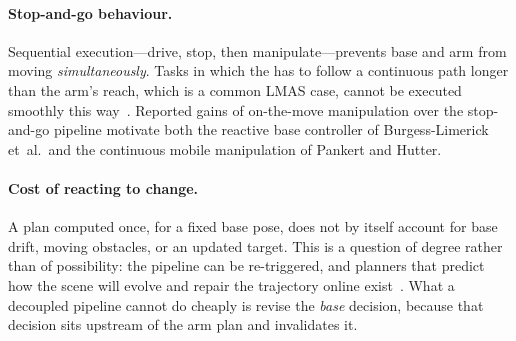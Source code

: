 \paragraph{Stop-and-go behaviour.}
Sequential execution---drive, stop, then manipulate---prevents base and
arm from moving \emph{simultaneously}. Tasks in which the \ee{} has to
follow a continuous path longer than the arm's reach, which is a common
LMAS case, cannot be executed smoothly this
way~\cite{BurgessLimerick2024ReactiveBase,Pankert2020PerceptiveMPC}.
Reported gains of on-the-move manipulation over the stop-and-go pipeline
motivate both the reactive base controller of Burgess-Limerick
et~al.\ and the continuous mobile manipulation of Pankert and Hutter.

\paragraph{Cost of reacting to change.}
A plan computed once, for a fixed base pose, does not by itself account
for base drift, moving obstacles, or an updated target. This is a
question of degree rather than of possibility: the pipeline can be
re-triggered, and planners that predict how the scene will evolve and
repair the trajectory online exist~\cite{Finean2023ContextAware}. What a
decoupled pipeline cannot do cheaply is revise the \emph{base} decision,
because that decision sits upstream of the arm plan and invalidates it.

